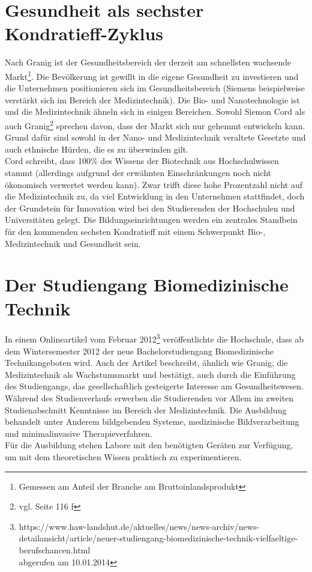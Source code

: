 \section{Gesundheit als sechster Kondratieff-Zyklus}

Nach Granig\cite{nefiodow:gesundheit} ist der Gesundheitsbereich der derzeit am schnellsten wachsende Markt\footnote{Gemessen am Anteil der Branche am Bruttoinlandsprodukt}. Die Bevölkerung ist gewillt in die eigene Gesundheit zu investieren und die Unternehmen positionieren sich im Gesundheitsbereich (Siemens beispielweise verstärkt sich im Bereich der Medizintechnik).
Die Bio- und Nanotechnologie ist und die Medizintechnik ähneln sich in einigen Bereichen. Sowohl Siemon Cord \cite{cord:innovation} als auch Granig\footnote{vgl. \cite{nefiodow:gesundheit} Seite 116 f} sprechen davon, dass der Markt sich nur gehemmt entwickeln kann. Grund dafür sind sowohl in der Nano- und Medizintechnik veraltete Gesetzte und auch ethnische Hürden, die es zu überwinden gilt.\\
Cord schreibt, dass 100\% des Wissens der Biotechnik aus Hochschulwissen stammt (allerdings aufgrund der erwähnten Einschränkungen noch nicht ökonomisch verwertet werden kann). Zwar trifft diese hohe Prozentzahl nicht auf die Medizintechnik zu, da viel Entwicklung in den Unternehmen stattfindet, doch der Grundstein für Innovation wird bei den Studierenden der Hochschulen und Universitäten gelegt. Die Bildungseinrichtungen werden ein zentrales Standbein für den kommenden sechsten Kondratieff mit einem Schwerpunkt Bio-, Medizintechnik und Gesundheit sein.

\section{Der Studiengang Biomedizinische Technik}
In einem Onlineartikel vom Februar 2012\footnote{https://www.haw-landshut.de/aktuelles/news/news-archiv/news-detailansicht/article/neuer-studiengang-biomedizinische-technik-vielfaeltige-berufschancen.html \\ abgerufen am 10.01.2014} veröffentlichte die Hochschule, dass ab dem Wintersemester 2012 der neue Bachelorstudiengang \glqq Biomedizinische Technik\grqq angeboten wird. Auch der Artikel beschreibt, ähnlich wie Granig, die Medizintechnik als Wachstumsmarkt und bestätigt, auch durch die Einführung des Studiengangs, das gesellschaftlich gesteigerte Interesse am Gesundheitswesen.\\
Während des Studienverlaufs \cite{hsla:modulBMT} erwerben die Studierenden vor Allem im zweiten Studienabschnitt Kenntnisse im Bereich der Medizintechnik. Die Ausbildung behandelt unter Anderem bildgebenden Systeme, medizinische Bildverarbeitung und minimalinvasive Therapieverfahren.\\
Für die Ausbildung stehen Labore mit den benötigten Geräten zur Verfügung, um mit dem theoretischen Wissen praktisch zu experimentieren.

